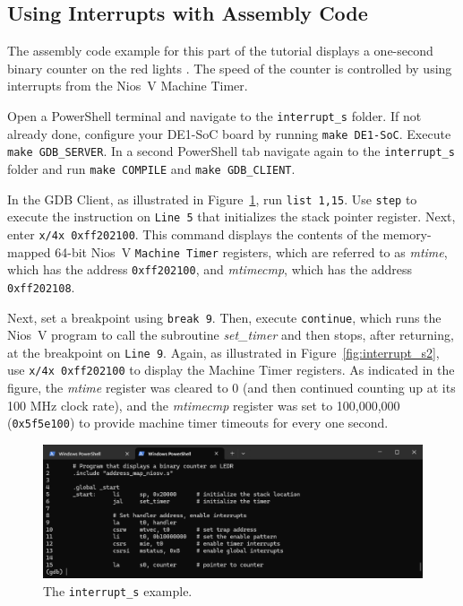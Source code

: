 \documentclass[11pt, twoside, pdftex]{article}
\newcommand{\red}[1]{{\color{red}\sf{#1}}}
\begin{document}
\subsection{Using Interrupts with Assembly Code}

The assembly code example for this part of the tutorial displays a one-second binary counter on 
the red lights \red{\it LEDR}. The speed of the counter is controlled by using interrupts from 
the Nios~V Machine Timer.  

Open a PowerShell terminal and navigate to the \texttt{interrupt\_s} folder.
If not already done, configure your DE1-SoC board by running \texttt{make DE1-SoC}. Execute 
\texttt{make GDB\_SERVER}. In a second PowerShell tab navigate again to the 
\texttt{interrupt\_s} folder and run \texttt{make COMPILE} and \texttt{make GDB\_CLIENT}.

In the GDB Client, as illustrated in Figure~\ref{fig:interrupt_s1}, run \texttt{list 1,15}. 
Use \texttt{step} to execute the instruction on \texttt{Line 5} that initializes the stack pointer
register. Next, enter \texttt{x/4x 0xff202100}. This command displays the contents 
of the memory-mapped 64-bit Nios~V \texttt{Machine Timer} registers, which are referred to as 
{\it mtime}, which has the address \texttt{0xff202100}, and {\it mtimecmp}, which has the
address \texttt{0xff202108}.

Next, set a breakpoint using \texttt{break 9}. Then, execute \texttt{continue}, which runs the
Nios~V program to call the subroutine {\it set\_timer} and then stops, after returning, at 
the breakpoint on \texttt{Line 9}. Again, as illustrated in Figure~\ref{fig:interrupt_s2}, use 
\texttt{x/4x~0xff202100} to display the Machine Timer registers. As indicated in the figure, 
the {\it mtime} register was cleared to 0 (and then continued counting up at its 100 MHz clock 
rate), and the {\it mtimecmp} register was set to 100,000,000 (\texttt{0x5f5e100}) to
provide machine timer timeouts for every one second.  

\begin{figure}[h]
    \begin{center}
        \includegraphics[scale=.6]{figures/interrupt_s1.png}
        \caption{The \texttt{interrupt\_s} example.}
        \label{fig:interrupt_s1}
    \end{center}
\end{figure}
\end{document}
